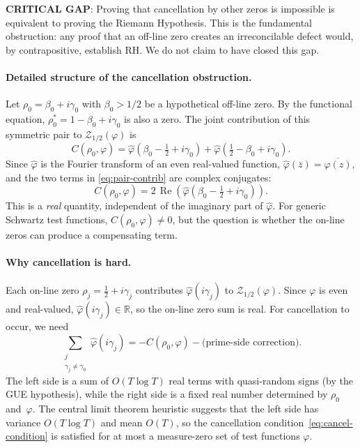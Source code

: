 \documentclass[11pt]{article}
\theoremstyle{remark}
\DeclareMathOperator{\Rea}{Re}
\begin{document}
\noindent\textbf{\textbf{CRITICAL GAP}}: Proving that cancellation by other zeros is
impossible is equivalent to proving the Riemann Hypothesis.
This is the fundamental obstruction: any proof that an off-line zero creates an
irreconcilable defect would, by contrapositive, establish RH.
We do not claim to have closed this gap.

\paragraph{Detailed structure of the cancellation obstruction.}
Let $\rho_0=\beta_0+i\gamma_0$ with $\beta_0>1/2$ be a hypothetical off-line zero.
By the functional equation, $\rho_0^*=1-\beta_0+i\gamma_0$ is also a zero.
The joint contribution of this symmetric pair to $\mathcal{Z}_{1/2}(\varphi)$ is
\begin{equation}\label{eq:pair-contrib}
  C(\rho_0,\varphi)
  = \hat{\varphi}(\beta_0-\tfrac{1}{2}+i\gamma_0)
  + \hat{\varphi}(\tfrac{1}{2}-\beta_0+i\gamma_0).
\end{equation}
Since $\hat{\varphi}$ is the Fourier transform of an even real-valued function,
$\hat{\varphi}(\bar{z})=\overline{\hat{\varphi}(z)}$, and the two terms in
\eqref{eq:pair-contrib} are complex conjugates:
\[
  C(\rho_0,\varphi)
  = 2\,\Rea\!\left(\hat{\varphi}(\beta_0-\tfrac{1}{2}+i\gamma_0)\right).
\]
This is a \emph{real} quantity, independent of the imaginary part of
$\hat{\varphi}$.
For generic Schwartz test functions, $C(\rho_0,\varphi)\neq 0$, but the question
is whether the on-line zeros can produce a compensating term.

\paragraph{Why cancellation is hard.}
Each on-line zero $\rho_j=\frac{1}{2}+i\gamma_j$ contributes
$\hat{\varphi}(i\gamma_j)$ to $\mathcal{Z}_{1/2}(\varphi)$.
Since $\varphi$ is even and real-valued, $\hat{\varphi}(i\gamma_j)\in\mathbb{R}$,
so the on-line zero sum is real.
For cancellation to occur, we need
\begin{equation}\label{eq:cancel-condition}
  \sum_{\substack{j\\\gamma_j\neq\gamma_0}}
  \hat{\varphi}(i\gamma_j)
  = -C(\rho_0,\varphi) - \text{(prime-side correction)}.
\end{equation}
The left side is a sum of $O(T\log T)$ real terms with quasi-random signs
(by the GUE hypothesis), while the right side is a fixed real number determined
by $\rho_0$ and~$\varphi$.
The central limit theorem heuristic suggests that the left side has variance
$O(T\log T)$ and mean $O(T)$, so the cancellation condition~\eqref{eq:cancel-condition}
is satisfied for at most a measure-zero set of test functions $\varphi$.
\end{document}
